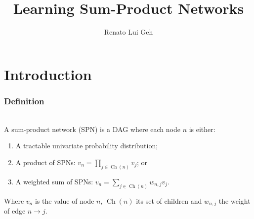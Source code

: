 \documentclass{beamer}
\title{Learning Sum-Product Networks}
\date{}
\author{Renato Lui Geh}
\institute{Institute of Mathematics and Statistics --- University of São Paulo}
\DeclareMathOperator*{\Ch}{\text{Ch}}
\begin{document}
\maketitle

\section{Introduction}

\begin{frame}
  \frametitle{Definition}
  \begin{definition}~\\
    A sum-product network (SPN) is a DAG where each node $n$ is either:
    \begin{enumerate}
      \item A tractable univariate probability distribution;
      \item A product of SPNs: $v_n=\prod_{j\in\Ch(n)}v_j$; or
      \item A weighted sum of SPNs: $v_n=\sum_{j\in\Ch(n)}w_{n,j}v_j$.
    \end{enumerate}
    Where $v_n$ is the value of node $n$, $\Ch(n)$ its set of children and $w_{n,j}$ the weight of
    edge $n\to j$.
  \end{definition}
\end{frame}
\end{document}
